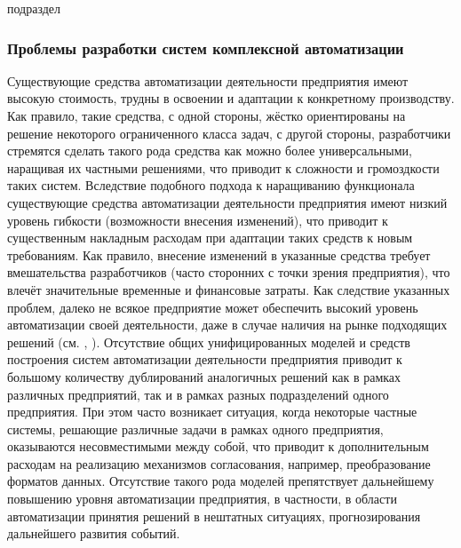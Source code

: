 \begin{SCn}

\begin{scnrelfromlist}{подраздел}
\end{scnrelfromlist}

\end{SCn}



\subsubsection{Проблемы разработки систем комплексной автоматизации}
\label{sec_chapter_enterprise_complex_automation}


Существующие средства автоматизации деятельности предприятия имеют высокую стоимость, трудны в освоении и адаптации к конкретному производству. Как правило, такие средства, с одной стороны, жёстко ориентированы на решение некоторого ограниченного класса задач, с другой стороны, разработчики стремятся сделать такого рода средства как можно более универсальными, наращивая их частными решениями, что приводит к сложности и громоздкости таких систем. Вследствие подобного подхода к наращиванию функционала существующие средства автоматизации деятельности предприятия имеют низкий уровень гибкости (возможности внесения изменений), что приводит к существенным накладным расходам при адаптации таких средств к новым требованиям. Как правило, внесение изменений в указанные средства требует вмешательства разработчиков (часто сторонних с точки зрения предприятия), что влечёт значительные временные и финансовые затраты. Как следствие указанных проблем, далеко не всякое предприятие может обеспечить высокий уровень автоматизации своей деятельности, даже в случае наличия на рынке подходящих решений (см. , ).
Отсутствие общих унифицированных моделей и средств построения систем автоматизации деятельности предприятия приводит к большому количеству дублирований аналогичных решений как в рамках различных предприятий, так и в рамках разных подразделений одного предприятия. При этом часто возникает ситуация, когда некоторые частные системы, решающие различные задачи в рамках одного предприятия, оказываются несовместимыми между собой, что приводит к дополнительным расходам на реализацию механизмов согласования, например, преобразование форматов данных. Отсутствие такого рода моделей препятствует дальнейшему повышению уровня автоматизации предприятия, в частности, в области автоматизации принятия решений в нештатных ситуациях, прогнозирования дальнейшего развития событий.

